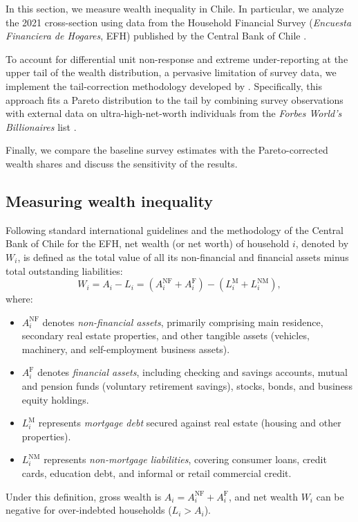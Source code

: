 In this section, we measure wealth inequality in Chile. In particular, we analyze the 2021 cross-section using data from the Household Financial Survey (\textit{Encuesta Financiera de Hogares}, EFH) published by the Central Bank of Chile \citep{bcentral2021efh}.

To account for differential unit non-response and extreme under-reporting at the upper tail of the wealth distribution, a pervasive limitation of survey data, we implement the tail-correction methodology developed by \citet{vermeulen2018}. Specifically, this approach fits a Pareto distribution to the tail by combining survey observations with external data on ultra-high-net-worth individuals from the \textit{Forbes World's Billionaires} list \citep{forbes2021billionaires,forbes2021kaggle}.

Finally, we compare the baseline survey estimates with the Pareto-corrected wealth shares and discuss the sensitivity of the results.

\subsection{Measuring wealth inequality}\label{sec:measuring-wealth}
Following standard international guidelines \citep[e.g.,][]{oecd2013wealth} and the methodology of the Central Bank of Chile for the EFH, net wealth (or net worth) of household $i$, denoted by $W_i$, is defined as the total value of all its non-financial and financial assets minus total outstanding liabilities:
\begin{equation}
    W_i = A_i - L_i = (A_i^{\text{NF}} + A_i^{\text{F}}) - (L_i^{\text{M}} + L_i^{\text{NM}}),
    \label{eq:net_wealth}
\end{equation}
where:
\begin{itemize}
    \item $A_i^{\text{NF}}$ denotes \textit{non-financial assets}, primarily comprising main residence, secondary real estate properties, and other tangible assets (vehicles, machinery, and self-employment business assets).
    \item $A_i^{\text{F}}$ denotes \textit{financial assets}, including checking and savings accounts, mutual and pension funds (voluntary retirement savings), stocks, bonds, and business equity holdings.
    \item $L_i^{\text{M}}$ represents \textit{mortgage debt} secured against real estate (housing and other properties).
    \item $L_i^{\text{NM}}$ represents \textit{non-mortgage liabilities}, covering consumer loans, credit cards, education debt, and informal or retail commercial credit.
\end{itemize}
Under this definition, gross wealth is $A_i = A_i^{\text{NF}} + A_i^{\text{F}}$, and net wealth $W_i$ can be negative for over-indebted households ($L_i > A_i$). 

